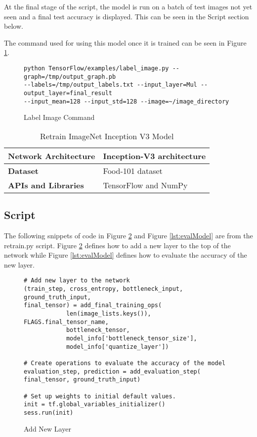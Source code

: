 At the final stage of the script, the model is run on a batch of test images not
yet seen and a final test accuracy is displayed. This can be seen in the Script
section below.

The command used for using this model once it is trained can be seen in Figure \ref{lst:labelImage}.
\begin{figure}
\caption{Label Image Command}
\label{lst:labelImage}
\begin{lstlisting}[style=Command]
python TensorFlow/examples/label_image.py --graph=/tmp/output_graph.pb
--labels=/tmp/output_labels.txt --input_layer=Mul --output_layer=final_result
--input_mean=128 --input_std=128 --image=~/image_directory
\end{lstlisting}
\end{figure}

\begin{table}[h]
\centering
\caption{Retrain ImageNet Inception V3 Model}
\label{my-label}
\begin{tabular}{|l|p{8cm}|}
\hline
\textbf{Network Architecture} & Inception-V3 architecture \parencite{inception}            \\ \hline
\textbf{Dataset}              & Food-101 dataset \\ \hline
\textbf{APIs and Libraries}   & TensorFlow and NumPy                                                        \\ \hline
\end{tabular}
\end{table}

\tocless\subsection{Script}
The following snippets of code in Figure \ref{lst:addNewLayer} and Figure \ref{lst:evalModel} are from the retrain.py script.
Figure \ref{lst:addNewLayer} defines how to add a new layer to the top of the network while Figure \ref{lst:evalModel} defines how to evaluate the accuracy of the new layer. 

\begin{figure}
\caption{Add New Layer \parencite{retrainInception}}
\label{lst:addNewLayer}
\begin{lstlisting}[style=Python]
# Add new layer to the network
(train_step, cross_entropy, bottleneck_input, ground_truth_input,
final_tensor) = add_final_training_ops(
            len(image_lists.keys()), FLAGS.final_tensor_name,
            bottleneck_tensor,
            model_info['bottleneck_tensor_size'],
            model_info['quantize_layer'])
 
# Create operations to evaluate the accuracy of the model
evaluation_step, prediction = add_evaluation_step(
final_tensor, ground_truth_input)
 
# Set up weights to initial default values.
init = tf.global_variables_initializer()
sess.run(init)
\end{lstlisting}
\end{figure}


